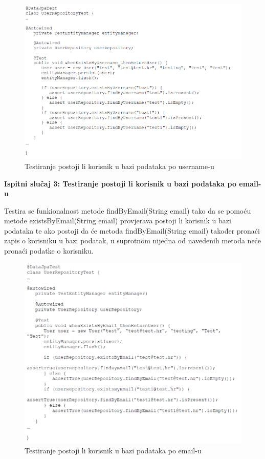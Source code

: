 				
				\begin{figure}[H]
					\includegraphics[scale=0.7]{slike/test2.PNG} %
					\centering
					\caption{Testiranje postoji li korisnik u bazi podataka po username-u}
					\label{fig:test2}
				\end{figure}
			
			\textbf{Ispitni slučaj 3: Testiranje postoji li korisnik u bazi podataka po email-u}
			
		Testira se funkionalnost metode findByEmail(String email) tako da se pomoću metode existsByEmail(String email) provjerava postoji li korisnik u bazi podataka te ako postoji da će metoda findByEmail(String email) također pronaći zapis o korisniku u bazi podatak, u suprotnom nijedna od navedenih metoda neće pronaći podatke o korisniku.
			
			\begin{figure}[H]
				\includegraphics[scale=0.7]{slike/test3.PNG} %
				\centering
				\caption{Testiranje postoji li korisnik u bazi podataka po email-u}
				\label{fig:test3}
			\end{figure}
		
